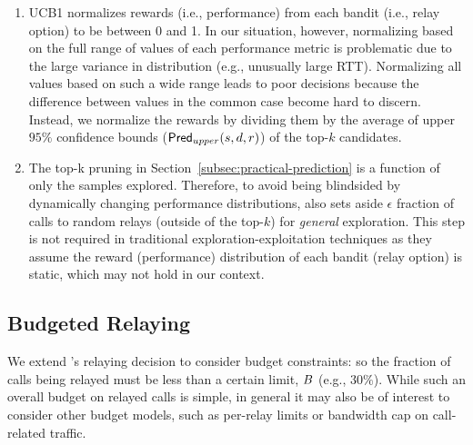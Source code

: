 \begin{enumerate}
\item UCB1 normalizes rewards (i.e., performance) from each bandit (i.e., relay option) to be between 0 and 1. In our situation, however, normalizing based on the full range of values of each performance metric is problematic due to 
the large variance in distribution %
(e.g., unusually large RTT). Normalizing all values based on such a wide range leads to poor decisions because the difference between values in the common case become hard to discern. Instead, we normalize the rewards by dividing them by the average of upper $95\%$ confidence bounds (${\sf\small Pred}_{upper}(s,d,r)$) of the top-$k$ candidates.%

\item The top-k pruning in Section~\ref{subsec:practical-prediction} is a function of only the samples explored. Therefore, to avoid being blindsided by dynamically changing performance distributions, \hybrid also sets aside $\epsilon$ fraction of calls to random relays (outside of the top-$k$) for {\em general} exploration. This step is not required in traditional exploration-exploitation techniques as they assume the reward (performance) distribution of each bandit (relay option) is static, which may not hold %
in our context.
\end{enumerate}


\subsection{Budgeted Relaying}
\label{subsec:practical-budget}

We extend {\hybrid}'s relaying decision to consider budget constraints: so the fraction of calls being relayed must be less than a certain limit, $B$ (e.g., $30\%$). While such an overall budget on relayed calls is simple, in general it may also be of interest to consider other budget models, such as per-relay limits or bandwidth cap on call-related traffic. 

